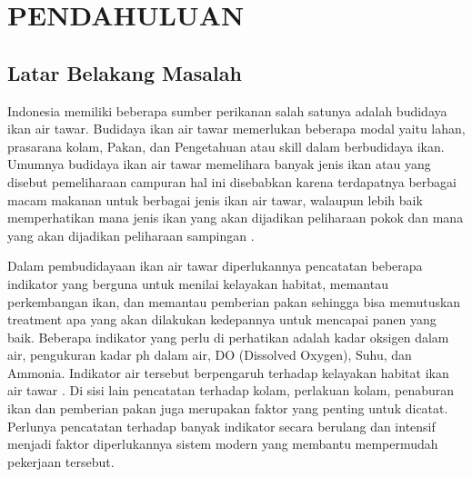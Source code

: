 
\chapter{PENDAHULUAN}

\section{Latar Belakang Masalah}
Indonesia memiliki beberapa sumber perikanan salah satunya adalah budidaya ikan air tawar. Budidaya ikan air tawar memerlukan beberapa modal yaitu lahan, prasarana kolam, Pakan, dan Pengetahuan atau skill dalam berbudidaya ikan. Umumnya budidaya ikan air tawar memelihara banyak jenis ikan atau yang disebut pemeliharaan campuran hal ini disebabkan karena terdapatnya berbagai macam makanan untuk berbagai jenis ikan air tawar, walaupun lebih baik memperhatikan mana jenis ikan yang akan dijadikan peliharaan pokok dan mana yang akan dijadikan peliharaan sampingan \citep{infishta2019web}.


Dalam pembudidayaan ikan air tawar diperlukannya pencatatan beberapa indikator yang berguna untuk menilai kelayakan habitat, memantau perkembangan ikan, dan memantau pemberian pakan sehingga bisa memutuskan treatment apa yang akan dilakukan kedepannya untuk mencapai panen yang baik. Beberapa indikator yang perlu di perhatikan adalah kadar oksigen dalam air, pengukuran kadar ph dalam air, DO (Dissolved Oxygen), Suhu, dan Ammonia. Indikator air tersebut berpengaruh terhadap kelayakan habitat ikan air tawar \citep{pramleonita2018parameter}. Di sisi lain pencatatan terhadap kolam, perlakuan kolam, penaburan ikan dan pemberian pakan juga merupakan faktor yang penting untuk dicatat. Perlunya pencatatan terhadap banyak indikator secara berulang dan intensif menjadi faktor diperlukannya sistem modern yang membantu mempermudah pekerjaan tersebut.

